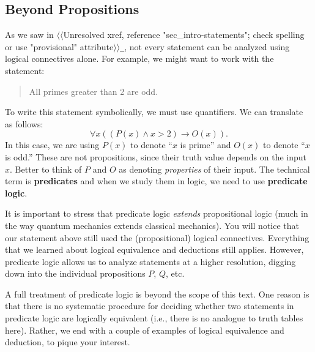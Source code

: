 \documentclass[10pt,]{book}
\newcommand{\terminology}[1]{\textbf{#1}}
\theoremstyle{plain}
\theoremstyle{definition}
\theoremstyle{definition}
\theoremstyle{definition}
\theoremstyle{definition}
\numberwithin{equation}{chapter}
\def\imp{\rightarrow}
\newcommand{\gt}{>}
\begin{document}
\subsection[{Beyond Propositions}]{Beyond Propositions}\label{subsection-41}
\hypertarget{p-1951}{}%
As we saw in {$\langle\langle$Unresolved xref, reference "sec\_intro-statements"; check spelling or use "provisional" attribute$\rangle\rangle$}\hyperlink{}{~}, not every statement can be analyzed using logical connectives alone.  For example, we might want to work with the statement:%
\begin{quote}\hypertarget{blockquote-12}{}
\hypertarget{p-1952}{}%
All primes greater than 2 are odd.%
\end{quote}
\hypertarget{p-1953}{}%
To write this statement symbolically, we must use quantifiers.  We can translate as follows:%
\begin{equation*}
\forall x ((P(x) \wedge x \gt 2) \imp O(x)).
\end{equation*}
In this case, we are using \(P(x)\) to denote ``\(x\) is prime'' and \(O(x)\) to denote ``\(x\) is odd.''  These are not propositions, since their truth value depends on the input \(x\).  Better to think of \(P\) and \(O\) as denoting \emph{properties} of their input.  The technical term is \terminology{predicates} and when we study them in logic, we need to use \terminology{predicate logic}.%
\par
\hypertarget{p-1954}{}%
It is important to stress that predicate logic \emph{extends} propositional logic (much in the way quantum mechanics extends classical mechanics).  You will notice that our statement above still used the (propositional) logical connectives.  Everything that we learned about logical equivalence and deductions still applies.  However, predicate logic allows us to analyze statements at a higher resolution, digging down into the individual propositions \(P\), \(Q\), etc.%
\par
\hypertarget{p-1955}{}%
A full treatment of predicate logic is beyond the scope of this text.  One reason is that there is no systematic procedure for deciding whether two statements in predicate logic are logically equivalent (i.e., there is no analogue to truth tables here).  Rather, we end with a couple of examples of logical equivalence and deduction, to pique your interest.%
\end{document}
